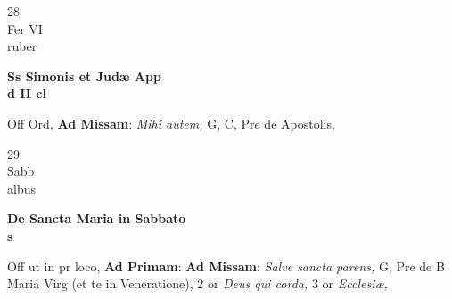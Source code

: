 \documentclass[10pt, openany]{book}
\begin{document}
        \begin{center}
            \begin{minipage}{3.5in}
                \vspace{2em}
                \begin{minipage}{0.5in}
                    {\Huge 28} \\
                    {\normalsize Fer VI} \\
                    {\normalsize ruber}
                \end{minipage}
                \begin{minipage}{3.0in}
                    \textbf{ \large Ss Simonis et Judæ App \\
                    \textnormal{\normalsize d II cl}} \\ 
                \end{minipage}
                \begin{justify}Off Ord, \textbf{Ad Missam}: \textit{Mihi autem,} G, C, Pre de Apostolis,  
                \end{justify}
            \end{minipage}
        \end{center}
    
        \begin{center}
            \begin{minipage}{3.5in}
                \vspace{2em}
                \begin{minipage}{0.5in}
                    {\Huge 29} \\
                    {\normalsize Sabb} \\
                    {\normalsize albus}
                \end{minipage}
                \begin{minipage}{3.0in}
                    \textbf{ \large De Sancta Maria in Sabbato \\
                    \textnormal{\normalsize s}} \\ 
                \end{minipage}
                \begin{justify}Off ut in pr loco, \textbf{Ad Primam}: \textbf{Ad Missam}: \textit{Salve sancta parens,} G, Pre de B Maria Virg (et te in Veneratione), 2 or \textit{Deus qui corda,} 3 or \textit{Ecclesiæ,}  
                \end{justify}
            \end{minipage}
        \end{center}
    
\end{document}
